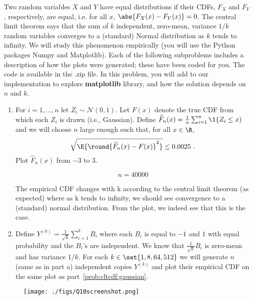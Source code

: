 \documentclass{article}
\begin{document}
\begin{aprob}
    Two random variables $X$ and $Y$ have equal  distributions if their CDFs, $F_X$ and $F_Y$, respectively, are equal, i.e. for all $x$, $ \abs{F_X(x) - F_Y(x)} = 0$. 
    The central limit theorem says that the sum of $k$ independent, zero-mean, variance $1/k$ random variables converges to a (standard) Normal distribution as $k$ tends to infinity.  
    We will study this phenomenon empirically (you will use the Python packages Numpy and Matplotlib).  Each of the following subproblems includes a description of how the plots were generated; these have been coded for you. The code is available in the .zip file. In this problem, you will add to our implementation to explore {\bf matplotlib} library, and how the solution depends on $n$ and $k$.
    
    \begin{enumerate}
    \item {}  \label{prob:cltcdf:gaussian} For $i=1,\ldots,n$ let $Z_i \sim \mathcal{N}(0,1)$. Let $F(x)$ denote the true CDF from which each $Z_i$ is drawn (i.e.,  Gaussian). Define  $\widehat{F}_n(x) = \frac{1}{n} \sum_{i=1}^n \1\{ Z_i \leq x)$ and we will choose $n$ large enough such that, for all $x \in \R$,
    \[
    	\sqrt{\E{\round{\widehat{F}_n(x)-F(x)}^2 }} \leq 0.0025\ .
    \]
    Plot $\widehat{F}_n(x)$ from $-3$ to $3$.
    
    $$n = 40000$$
    
    The empirical CDF changes with k according to the central limit theorem (as expected) where as k tends to infinity, we should see convergence to a (standard) normal distribution. From the plot, we indeed see that this is the case.
    
    \item  {}  Define $Y^{(k)} = \frac{1}{\sqrt{k}} \sum_{i=1}^k B_i$ where each $B_i$ is equal to $-1$ and $1$ with equal probability and the $B_i$'s are independent.
    We know that $\frac{1}{\sqrt{k}} B_i$ is zero-mean and has variance $1/k$.  \label{prob:cltcdf:k} For each $k \in \set{1, 8, 64, 512}$ we will generate $n$ (same as in part a) independent copies $Y^{(k)}$ and plot their empirical CDF on the same plot as part~\ref{prob:cltcdf:gaussian}.
    \end{enumerate}
    
    \begin{figure}[htp] 
    \centering
    \vspace*{-0.1in}
    \texttt{[image: ./figs/Q10screenshot.png]}
    \label{figs:Q10screenshot.png}
    \end{figure}
    
\end{aprob}
\end{document}
